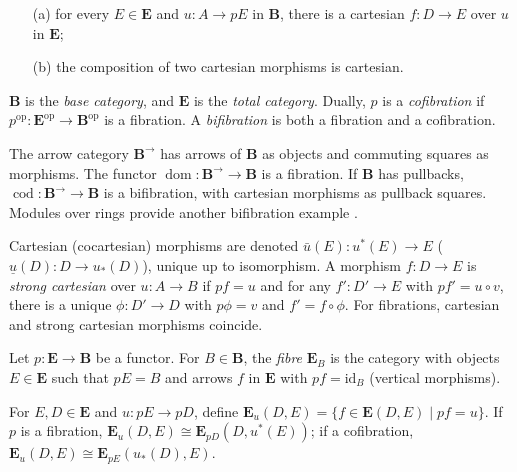 \documentclass{article}
\begin{document}
\begin{definition}
\begin{enumerate}
\begin{itemize}
            \item[(a)] for every $E \in \mathbf{E}$ and $u : A \to p E$ in $\mathbf{B}$, there is a cartesian $f : D \to E$ over $u$ in $\mathbf{E}$;
            \item[(b)] the composition of two cartesian morphisms is cartesian.
        \end{itemize}
        $\mathbf{B}$ is the \emph{base category}, and $\mathbf{E}$ is the \emph{total category}. Dually, $p$ is a \emph{cofibration} if $p^{\text{op}} : \mathbf{E}^{\text{op}} \to \mathbf{B}^{\text{op}}$ is a fibration. A \emph{bifibration} is both a fibration and a cofibration.
\end{enumerate}
\end{definition}

The arrow category $\mathbf{B}^{\to}$ has arrows of $\mathbf{B}$
as objects and commuting squares as morphisms. The functor
$\operatorname{dom} : \mathbf{B}^{\to} \to \mathbf{B}$ is a
fibration. If $\mathbf{B}$ has pullbacks,
$\operatorname{cod} : \mathbf{B}^{\to} \to \mathbf{B}$ is a
bifibration, with cartesian morphisms as pullback squares.
Modules over rings provide another bifibration example \cite{Gray1966}.

Cartesian (cocartesian) morphisms are denoted
$\bar{u}(E) : u^*(E) \to E$ ($\underline{u}(D) : D \to u_*(D)$),
unique up to isomorphism. A morphism $f : D \to E$ is \emph{strong cartesian}
over $u : A \to B$ if $p f = u$ and for any $f' : D' \to E$ with $p f' = u \circ v$,
there is a unique $\phi : D' \to D$ with $p \phi = v$ and $f' = f \circ \phi$.
For fibrations, cartesian and strong cartesian morphisms coincide.

\begin{definition}
\label{def:2.2}
Let $p : \mathbf{E} \to \mathbf{B}$ be a functor. For $B \in \mathbf{B}$,
the \emph{fibre} $\mathbf{E}_B$ is the category with objects $E \in \mathbf{E}$
such that $p E = B$ and arrows $f$ in $\mathbf{E}$ with $p f = \text{id}_B$ (vertical
morphisms).
\end{definition}

For $E, D \in \mathbf{E}$ and $u : p E \to p D$,
define $\mathbf{E}_u(D, E) = \{ f \in \mathbf{E}(D, E) \mid p f = u \}$.
If $p$ is a fibration, $\mathbf{E}_u(D, E) \cong \mathbf{E}_{p D}(D, u^*(E))$;
if a cofibration, $\mathbf{E}_u(D, E) \cong \mathbf{E}_{p E}(u_*(D), E)$.
\end{document}
